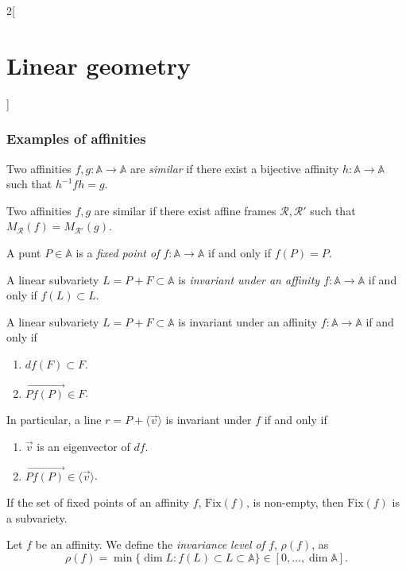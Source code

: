 \documentclass[class=article,10pt,crop=false]{standalone}
\begin{document}
\begin{multicols}{2}[\section{Linear geometry}]
\subsubsection{Examples of affinities}
\begin{definition}
Two affinities $f,g:\mathbb{A}\rightarrow\mathbb{A}$ are \textit{similar} if there exist a bijective affinity $h:\mathbb{A}\rightarrow\mathbb{A}$ such that $h^{-1}fh=g$.
\end{definition}
\begin{prop}
Two affinities $f,g$ are similar if there exist affine frames $\mathcal{R},\mathcal{R}'$ such that $M_\mathcal{R}(f)=M_{\mathcal{R}'}(g)$.
\end{prop}
\begin{definition}
A punt $P\in\mathbb{A}$ is a \textit{fixed point of $f:\mathbb{A}\rightarrow\mathbb{A}$} if and only if $f(P)=P$.
\end{definition}
\begin{definition}
A linear subvariety $L=P+F\subset\mathbb{A}$ is \textit{invariant under an affinity $f:\mathbb{A}\rightarrow\mathbb{A}$} if and only if $f(L)\subset L$.
\end{definition}
\begin{prop}
A linear subvariety $L=P+F\subset\mathbb{A}$ is invariant under an affinity $f:\mathbb{A}\rightarrow\mathbb{A}$ if and only if
\begin{enumerate}
    \item $df(F)\subset F$.
    \item $\overrightarrow{Pf(P)}\in F$.
\end{enumerate} In particular, a line $r=P+\langle\overrightarrow{v}\rangle$ is invariant under $f$ if and only if
\begin{enumerate}
    \item $\overrightarrow{v}$ is an eigenvector of $df$.
    \item $\overrightarrow{Pf(P)}\in\langle\overrightarrow{v}\rangle$.
\end{enumerate}
\end{prop}
\begin{prop}
If the set of fixed points of an affinity $f$, $\text{Fix}(f)$, is non-empty, then $\text{Fix}(f)$ is a subvariety.
\end{prop}
\begin{definition}
Let $f$ be an affinity. We define the \textit{invariance level of $f$}, $\rho(f)$, as $$\rho(f)=\min\{\dim L:f(L)\subset L\subset\mathbb{A}\}\in[0,\ldots,\dim\mathbb{A}].$$  
\end{definition}

\end{multicols}
\end{document}

